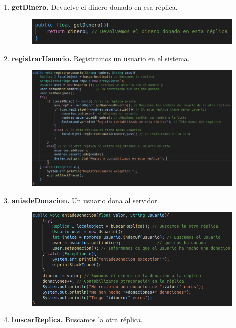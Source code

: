 \documentclass{article}
\begin{document}
	\begin{enumerate}
		\item {\bf getDinero.} Devuelve el dinero donado en esa réplica.
		\begin{figure}[H]
			\centering
			\includegraphics[totalheight=1.55cm]{img/8.png}
		\end{figure}
		\item {\bf registrarUsuario.}  Registramos un usuario en el sistema.
		\begin{figure}[H]
			\centering
			\includegraphics[totalheight=7cm]{img/9.png}
			\end{figure}
		\item {\bf aniadeDonacion.} Un usuario dona al servidor.
		\begin{figure}[H]
			\centering
			\includegraphics[totalheight=5.5cm]{img/10.png}
		\end{figure}
		\item {\bf buscarReplica.} Buscamos la otra réplica.
		\begin{figure}[H]

\end{figure}
\end{enumerate}
\end{document}
